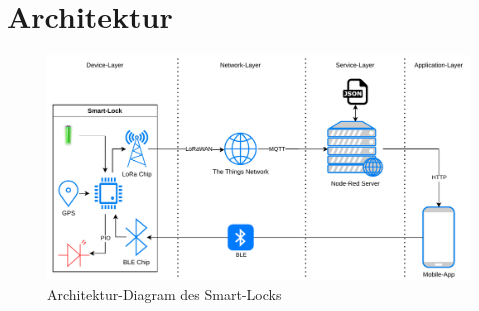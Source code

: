
\chapter{Architektur}

\begin{figure}[!htbp]
    \centering
    \includegraphics[width=1\linewidth]{images/architecture_smart_lock.pdf}
    \caption[Architektur-Diagram des Smart-Locks]{Architektur-Diagram des Smart-Locks}
    \label{fig:architektur}
\end{figure}




